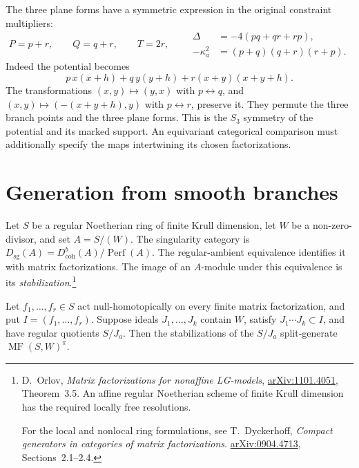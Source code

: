 The three plane forms have a symmetric expression
in the original constraint multipliers:
\begin{equation}\label{mc:tcrm:eq:symmetric}
 P=p+r,\qquad Q=q+r,\qquad T=2r,
 \qquad
 \begin{aligned}
 \Delta&=-4(pq+qr+rp),\\
 -\kappa_a^2&=(p+q)(q+r)(r+p).
 \end{aligned}
\end{equation}
Indeed the potential becomes
\[
 p\,x(x+h)+q\,y(y+h)+r(x+y)(x+y+h).
\]
The transformations $(x,y)\mapsto(y,x)$ with
$p\leftrightarrow q$, and
$(x,y)\mapsto(-(x+y+h),y)$ with
$p\leftrightarrow r$, preserve it. They permute
the three branch points and the three plane forms.
This is the $S_3$ symmetry of the potential and its
marked support. An equivariant categorical comparison
must additionally specify the maps intertwining its
chosen factorizations.

\section{Generation from smooth branches}

Let $S$ be a regular Noetherian ring of finite Krull
dimension, let $W$ be a non-zero-divisor, and set
$A=S/(W)$. The singularity category is
$D_{\mathrm{sg}}(A)=D^b_{\mathrm{coh}}(A)/\operatorname{Perf}(A)$.
The regular-ambient equivalence identifies it with
matrix factorizations. The image of an $A$-module under
this equivalence is its \emph{stabilization}.\footnote{
D.~Orlov, \emph{Matrix factorizations for nonaffine LG-models},
\href{https://arxiv.org/abs/1101.4051}{arXiv:1101.4051},
Theorem~3.5. An affine regular Noetherian scheme of finite
Krull dimension has the required locally free resolutions.

For the local and nonlocal ring formulations, see
T.~Dyckerhoff, \emph{Compact generators in categories of
matrix factorizations}.
\href{https://arxiv.org/abs/0904.4713}{arXiv:0904.4713},
Sections~2.1--2.4.}

\begin{proposition}\label{mc:cgcr:prop:branches}
Let $f_1,\ldots,f_r\in S$ act null-homotopically on
every finite matrix factorization, and put $I=(f_1,\ldots,f_r)$.
Suppose ideals $J_1,\ldots,J_k$ contain $W$, satisfy
$J_1\cdots J_k\subset I$, and have regular quotients $S/J_a$.
Then the stabilizations of the $S/J_a$ split-generate
$\operatorname{MF}(S,W)^\pi$.
\end{proposition}

